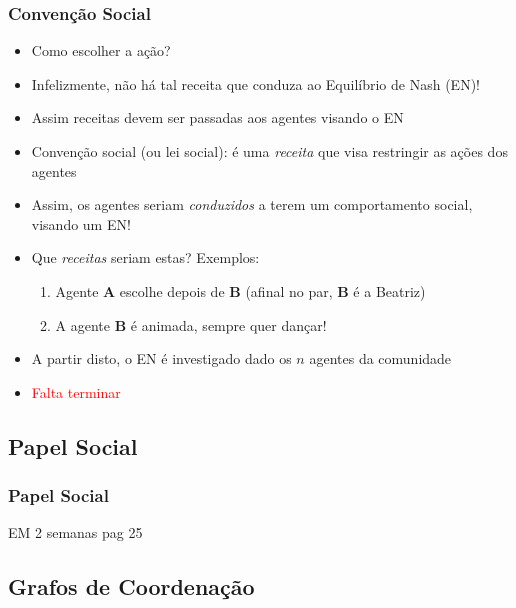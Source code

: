 \begin{frame}
\frametitle{Convenção Social}

\begin{itemize}
  \item Como escolher a ação?
  \item Infelizmente, não há tal receita que conduza ao Equilíbrio de Nash (EN)!
  \item Assim receitas devem ser passadas aos agentes visando o EN

\pause
  \item Convenção social (ou lei social): é uma \textit{receita} que visa
  restringir as ações  dos agentes
  
  \item Assim, os agentes seriam \textit{conduzidos} a terem um comportamento
  social, visando um EN!
  
  \item Que \textit{receitas} seriam estas? Exemplos:
  \pause
  \begin{enumerate}
    \item Agente \textbf{A} escolhe depois de \textbf{B} (afinal no par, \textbf{B} é a Beatriz)
    \item A agente \textbf{B} é animada, sempre quer dançar!
  \end{enumerate}
  
\item A partir disto, o EN é investigado dado os $n$ agentes da comunidade


  \item \textcolor{red}{Falta terminar}
 
\end{itemize}


\end{frame}

\subsection{Papel Social}

\begin{frame}
\frametitle{Papel Social}

EM 2 semanas
pag 25


\end{frame}



\subsection{Grafos de Coordenação}

